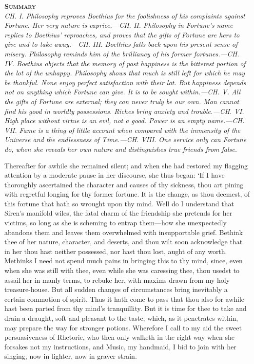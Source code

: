 \documentclass[12pt]{book}
\newenvironment{abstract}%
  {\noindent \textbf{\scshape Summary} \\ \rightskip1in\itshape\small}%
  {\bigskip}
\begin{document}
\begin{abstract}
     CH. I. Philosophy reproves Boethius for the foolishness of his
     complaints against Fortune. Her very nature is caprice.---CH. II.
     Philosophy in Fortune's name replies to Boethius' reproaches, and
     proves that the gifts of Fortune are hers to give and to take
     away.---CH. III. Boethius falls back upon his present sense of
     misery. Philosophy reminds him of the brilliancy of his former
     fortunes.---CH. IV. Boethius objects that the memory of past
     happiness is the bitterest portion of the lot of the unhappy.
     Philosophy shows that much is still left for which he may be
     thankful. None enjoy perfect satisfaction with their lot. But
     happiness depends not on anything which Fortune can give. It is to
     be sought within.---CH. V. All the gifts of Fortune are external;
     they can never truly be our own. Man cannot find his good in
     worldly possessions. Riches bring anxiety and trouble.---CH. VI.
     High place without virtue is an evil, not a good. Power is an empty
     name.---CH. VII. Fame is a thing of little account when compared
     with the immensity of the Universe and the endlessness of
     Time.---CH. VIII. One service only can Fortune do, when she reveals
     her own nature and distinguishes true friends from false.
\end{abstract}





Thereafter for awhile she remained silent; and when she had restored my
flagging attention by a moderate pause in her discourse, she thus began:
`If I have thoroughly ascertained the character and causes of thy
sickness, thou art pining with regretful longing for thy former fortune.
It is the change, as thou deemest, of this fortune that hath so wrought
upon thy mind. Well do I understand that Siren's manifold wiles, the
fatal charm of the friendship she pretends for her victims, so long as
she is scheming to entrap them---how she unexpectedly abandons them and
leaves them overwhelmed with insupportable grief. Bethink thee of her
nature, character, and deserts, and thou wilt soon acknowledge that in
her thou hast neither possessed, nor hast thou lost, aught of any worth.
Methinks I need not spend much pains in bringing this to thy mind,
since, even when she was still with thee, even while she was caressing
thee, thou usedst to assail her in manly terms, to rebuke her, with
maxims drawn from my holy treasure-house. But all sudden changes of
circumstances bring inevitably a certain commotion of spirit. Thus it
hath come to pass that thou also for awhile hast been parted from thy
mind's tranquillity. But it is time for thee to take and drain a
draught, soft and pleasant to the taste, which, as it penetrates within,
may prepare the way for stronger potions. Wherefore I call to my aid the
sweet persuasiveness of Rhetoric, who then only walketh in the right way
when she forsakes not my instructions, and Music, my handmaid, I bid to
join with her singing, now in lighter, now in graver strain.
\end{document}
